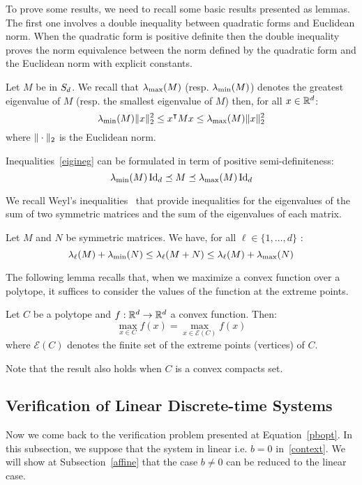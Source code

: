 \documentclass[10pt]{article}
\begin{document}
To prove some results, we need to recall some basic results presented as lemmas. The first one involves a double inequality between quadratic forms and Euclidean norm. When the quadratic form is positive definite then the double inequality proves the norm equivalence between the norm defined by the quadratic form and the Euclidean norm with explicit constants. 
\begin{lemma}
\label{lemma1}
Let $M$ be in $S_d$. We recall that $\lambda_{\operatorname{max}}(M)$ (resp. $\lambda_{\operatorname{min}}(M)$) denotes the greatest eigenvalue of $M$ (resp. the smallest eigenvalue of $M$) then, for all $x\in \mathbb R^d$:
\begin{equation}
\label{eigineg}
\lambda_{\operatorname{min}}(M)\| x\|_2^2\leq x^\intercal M x\leq \lambda_{\operatorname{max}}(M) \| x\|_2^2
\end{equation}
where $\| \cdot\|_2$ is the Euclidean norm. 
\end{lemma}
Inequalities~\eqref{eigineg} can be formulated in term of positive semi-definiteness:
\[
\lambda_{\operatorname{min}}(M)\operatorname{Id}_d\preceq M\preceq \lambda_{\operatorname{max}}(M)\operatorname{Id}_d
\]

We recall Weyl's inequalities~\cite{horn1990matrix} that provide inequalities for the eigenvalues of the sum of two symmetric matrices and the sum of the eigenvalues of each matrix.  
\begin{lemma}
\label{lemmaWeyl}
Let $M$ and $N$ be symmetric matrices. We have, for all $\ell\in\{1,\ldots,d\}$ :
\[
\lambda_\ell(M)+\lambda_{\operatorname{min}}(N)\leq \lambda_\ell(M+N)\leq \lambda_\ell(M)+\lambda_{\operatorname{max}}(N)
\]
\end{lemma}
The following lemma recalls that, when we maximize a convex function over a polytope, it suffices to consider the values of the function at the extreme points. 
\begin{lemma}
\label{lemma2}
Let $C$ be a polytope and $f:\mathbb R^d\to\mathbb R^d$ a convex function. Then:
\[
\max_{x\in C} f(x)=\max_{x\in \mathcal{E}(C)} f(x)
\]
where $\mathcal{E}(C)$ denotes the finite set of the extreme points (vertices) of $C$.
\end{lemma}
Note that the result also holds when $C$ is a convex compacts set.  
\subsection{Verification of Linear Discrete-time Systems}
\label{mainsub}
Now we come back to the verification problem presented at Equation~\eqref{pbopt}. In this subsection, we suppose that the system in linear i.e. $b=0$ in~\eqref{context}. We will show at Subsection~\ref{affine} that the case $b\neq 0$ can be reduced to the linear case.
\end{document}
